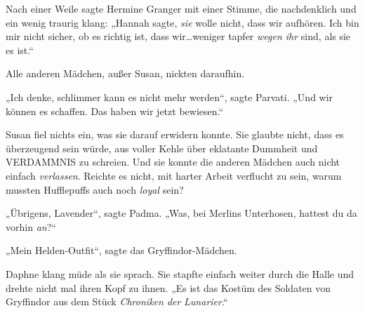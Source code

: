 Nach einer Weile sagte Hermine Granger mit einer Stimme, die nachdenklich und ein wenig traurig klang: „Hannah sagte, \emph{sie} wolle nicht, dass wir aufhören. Ich bin mir nicht sicher, ob es richtig ist, dass wir…weniger tapfer \emph{wegen ihr} sind, als sie es ist.“

Alle anderen Mädchen, außer Susan, nickten daraufhin.

„Ich denke, schlimmer kann es nicht mehr werden“, sagte Parvati. „Und wir können es schaffen. Das haben wir jetzt bewiesen.“

Susan fiel nichts ein, was sie darauf erwidern konnte. Sie glaubte nicht, dass es überzeugend sein würde, aus voller Kehle über eklatante Dummheit und VERDAMMNIS zu schreien. Und sie konnte die anderen Mädchen auch nicht einfach \emph{verlassen}. Reichte es nicht, mit harter Arbeit verflucht zu sein, warum mussten Hufflepuffs auch noch \emph{loyal} sein?

„Übrigens, Lavender“, sagte Padma. „Was, bei Merlins Unterhosen, hattest du da vorhin \emph{an}?“

„Mein Helden-Outfit“, sagte das Gryffindor-Mädchen.

Daphne klang müde als sie sprach. Sie stapfte einfach weiter durch die Halle und drehte nicht mal ihren Kopf zu ihnen. „Es ist das Kostüm des Soldaten von Gryffindor aus dem Stück \emph{Chroniken der} \emph{Lunarier}.“%

